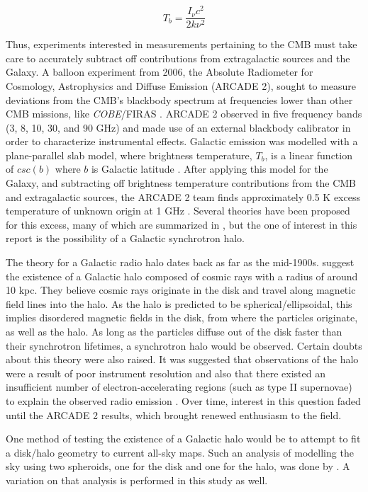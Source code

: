 \documentclass[%
onecolumn,
11pt,
tightenlines,
notitlepage,
superscriptaddress,
nofootinbib,
amsmath,amssymb,
aps,
pra,
]{revtex4-1}
\begin{document}
\begin{equation}
T_{b} = \frac{I_{\nu}c^{2}}{2k\nu^{2}}
\label{RJ}
\end{equation}

Thus, experiments interested in measurements pertaining to the CMB must take care to accurately subtract off contributions from extragalactic sources and the Galaxy. A balloon experiment from 2006, the Absolute Radiometer for Cosmology, Astrophysics and Diffuse Emission (ARCADE 2), sought to measure deviations from the CMB's blackbody spectrum at frequencies lower than other CMB missions, like \emph{COBE}/FIRAS \citep{Fixsen2011}. ARCADE 2 observed in five frequency bands (3, 8, 10, 30, and 90 GHz) and made use of an external blackbody calibrator in order to characterize instrumental effects. Galactic emission was modelled with a plane-parallel slab model, where brightness temperature, $T_{b}$, is a linear function of $csc(b)$ where $b$ is Galactic latitude \citep{Kogut2011}. After applying this model for the Galaxy, and subtracting off brightness temperature contributions from the CMB and extragalactic sources, the ARCADE 2 team finds approximately 0.5 K excess temperature of unknown origin at 1 GHz \citep{Seiffert2011}. Several theories have been proposed for this excess, many of which are summarized in \cite{Singal2018}, but the one of interest in this report is the possibility of a Galactic synchrotron halo. 

The theory for a Galactic radio halo dates back as far as the mid-1900s. \cite{Ginzburg1961} suggest the existence of a Galactic halo composed of cosmic rays with a radius of around 10 kpc. They believe cosmic rays originate in the disk and travel along magnetic field lines into the halo. As the halo is predicted to be spherical/ellipsoidal, this implies disordered magnetic fields in the disk, from where the particles originate, as well as the halo. As long as the particles diffuse out of the disk faster than their synchrotron lifetimes, a synchrotron halo would be observed. 
Certain doubts about this theory were also raised. It was suggested that observations of the halo were a result of poor instrument resolution and also that there existed an insufficient number of electron-accelerating regions (such as type II supernovae) to explain the observed radio emission \citep{Mills1959}. Over time, interest in this question faded until the ARCADE 2 results, which brought renewed enthusiasm to the field.

One method of testing the existence of a Galactic halo would be to attempt to fit a disk/halo geometry to current all-sky maps. Such an analysis of modelling the sky using two spheroids, one for the disk and one for the halo, was done by \cite{Subrahmanyan2013}. A variation on that analysis is performed in this study as well.
\end{document}
